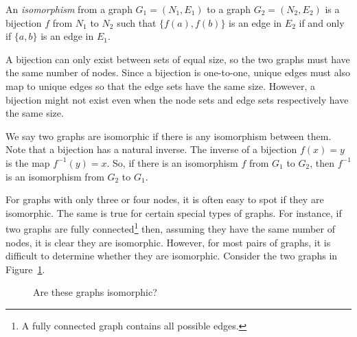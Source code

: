 \documentclass{iansnotes}
\begin{document}
  An \emph{isomorphism} from a graph $G_1 = (N_1,E_1)$ to a graph $G_2 = (N_2,E_2)$ is a bijection $f$ from $N_1$ to $N_2$ such that $\{f(a),f(b)\}$ is an edge in $E_2$ if and only if $\{a,b\}$ is an edge in $E_1$.

  A bijection can only exist between sets of equal size, so the two graphs must have the same number of nodes.
  Since a bijection is one-to-one, unique edges must also map to unique edges so that the edge sets have the same size.
  However, a bijection might not exist even when the node sets and edge sets respectively have the same size.

  We say two graphs are isomorphic if there is any isomorphism between them.
  Note that a bijection has a natural inverse.
  The inverse of a bijection $f(x) = y$ is the map $f^{-1}(y) = x$.
  So, if there is an isomorphism $f$ from $G_1$ to $G_2$, then $f^{-1}$ is an isomorphism from $G_2$ to $G_1$.

  For graphs with only three or four nodes, it is often easy to spot if they are isomorphic.
  The same is true for certain special types of graphs.
  For instance, if two graphs are fully connected\footnote{A fully connected graph contains all possible edges.} then, assuming they have the same number of nodes, it is clear they are isomorphic.
  However, for most pairs of graphs, it is difficult to determine whether they are isomorphic.
  Consider the two graphs in Figure~\ref{figure:twographsiso}.

  \begin{figure}
    \centering
    \caption{Are these graphs isomorphic?}
    \label{figure:twographsiso}
  \end{figure}
\end{document}
